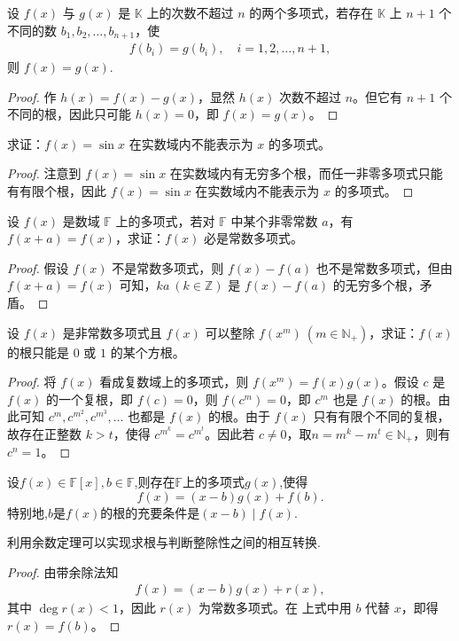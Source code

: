 \documentclass[lang=cn,newtx,10pt,scheme=chinese]{elegantbook}
\begin{document}
\begin{corollary}[两个多项式相等的判定准则]\label{corollary:两个多项式相等的判定准则}
设 $f(x)$ 与 $g(x)$ 是 $\mathbb{K}$ 上的次数不超过 $n$ 的两个多项式，若存在 $\mathbb{K}$ 上 $n + 1$ 个不同的数 $b_1, b_2, \ldots, b_{n+1}$，使
\begin{align*}
f(b_i) = g(b_i), \quad i = 1, 2, \ldots, n + 1,
\end{align*}
则 $f(x) = g(x)$.
\end{corollary}
\begin{proof}
作 $h(x) = f(x) - g(x)$，显然 $h(x)$ 次数不超过 $n$。但它有 $n + 1$ 个不同的根，因此只可能 $h(x) = 0$，即 $f(x) = g(x)$。
\end{proof}

\begin{example}
求证：$f(x) = \sin x$ 在实数域内不能表示为 $x$ 的多项式。
\end{example}
\begin{proof}
注意到 $f(x) = \sin x$ 在实数域内有无穷多个根，而任一非零多项式只能有有限个根，因此 $f(x) = \sin x$ 在实数域内不能表示为 $x$ 的多项式。
\end{proof}

\begin{example}
设 $f(x)$ 是数域 $\mathbb{F}$ 上的多项式，若对 $\mathbb{F}$ 中某个非零常数 $a$，有 $f(x + a) = f(x)$，求证：$f(x)$ 必是常数多项式。
\end{example}
\begin{proof}
假设 $f(x)$ 不是常数多项式，则 $f(x) - f(a)$ 也不是常数多项式，但由 $f(x + a) = f(x)$ 可知，$ka \ (k \in \mathbb{Z})$ 是 $f(x) - f(a)$ 的无穷多个根，矛盾。
\end{proof}

\begin{example}
设 $f(x)$ 是非常数多项式且 $f(x)$ 可以整除 $f(x^m) \ (m \in \mathbb{N}_+)$，求证：$f(x)$ 的根只能是 $0$ 或 $1$ 的某个方根。
\end{example}
\begin{proof}
将 $f(x)$ 看成复数域上的多项式，则 $f(x^m) = f(x)g(x)$。假设 $c$ 是 $f(x)$ 的一个复根，即 $f(c) = 0$，则 $f(c^m) = 0$，即 $c^m$ 也是 $f(x)$ 的根。由此可知 $c^m, c^{m^2}, c^{m^3}, \ldots$ 也都是 $f(x)$ 的根。由于 $f(x)$ 只有有限个不同的复根，故存在正整数 $k>t$，使得 $c^{m^k} = c^{m^t}$。因此若 $c \neq 0$，取$n=m^k-m^t\in \mathbb{N}_+$，则有 $c^n = 1$。
\end{proof}


\begin{theorem}[余数定理]\label{theorem:余数定理}
设\(f(x)\in\mathbb{F}[x], b\in\mathbb{F}\),则存在\(\mathbb{F}\)上的多项式\(g(x)\),使得
\[
f(x)=(x - b)g(x)+f(b).
\]
特别地,\(b\)是\(f(x)\)的根的充要条件是\((x - b)\mid f(x)\).
\end{theorem}
\begin{note}
利用余数定理可以实现求根与判断整除性之间的相互转换.
\end{note}
\begin{proof}
由带余除法知
\begin{align*}
f(x) = (x - b)g(x) + r(x),
\end{align*}
其中 $\deg r(x) < 1$，因此 $r(x)$ 为常数多项式。在 上式中用 $b$ 代替 $x$，即得 $r(x) = f(b)$。
\end{proof}
\end{document}
